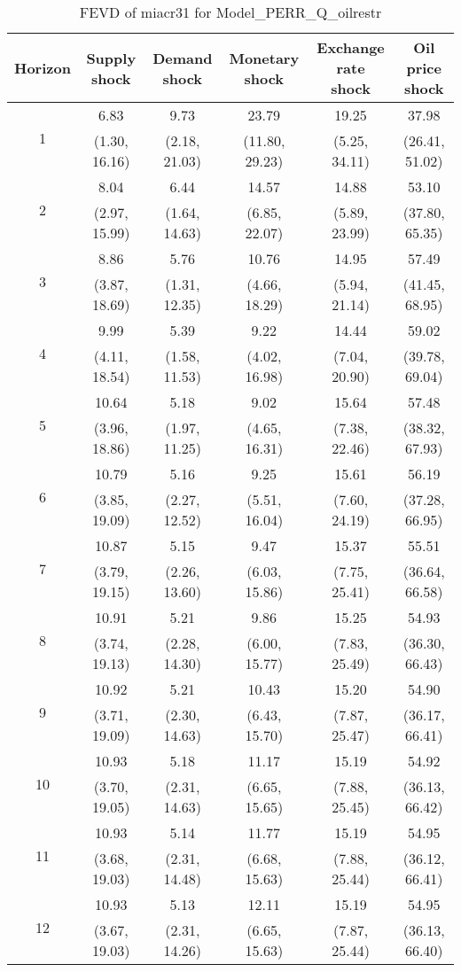 \documentclass{article}
\begin{document}
\begin{table}
	\footnotesize
	\caption{FEVD of miacr31 for Model_PERR_Q_oilrestr}
	\begin{tabular}{cccccc}
		Horizon & Supply shock & Demand shock & Monetary shock & Exchange rate shock & Oil price shock\\ \hline
		\multirow{2}{*}{1} & 6.83 & 9.73 & 23.79 & 19.25 & 37.98\\
		 & (1.30, 16.16) & (2.18, 21.03) & (11.80, 29.23) & (5.25, 34.11) & (26.41, 51.02)\\
		\multirow{2}{*}{2} & 8.04 & 6.44 & 14.57 & 14.88 & 53.10\\
		 & (2.97, 15.99) & (1.64, 14.63) & (6.85, 22.07) & (5.89, 23.99) & (37.80, 65.35)\\
		\multirow{2}{*}{3} & 8.86 & 5.76 & 10.76 & 14.95 & 57.49\\
		 & (3.87, 18.69) & (1.31, 12.35) & (4.66, 18.29) & (5.94, 21.14) & (41.45, 68.95)\\
		\multirow{2}{*}{4} & 9.99 & 5.39 & 9.22 & 14.44 & 59.02\\
		 & (4.11, 18.54) & (1.58, 11.53) & (4.02, 16.98) & (7.04, 20.90) & (39.78, 69.04)\\
		\multirow{2}{*}{5} & 10.64 & 5.18 & 9.02 & 15.64 & 57.48\\
		 & (3.96, 18.86) & (1.97, 11.25) & (4.65, 16.31) & (7.38, 22.46) & (38.32, 67.93)\\
		\multirow{2}{*}{6} & 10.79 & 5.16 & 9.25 & 15.61 & 56.19\\
		 & (3.85, 19.09) & (2.27, 12.52) & (5.51, 16.04) & (7.60, 24.19) & (37.28, 66.95)\\
		\multirow{2}{*}{7} & 10.87 & 5.15 & 9.47 & 15.37 & 55.51\\
		 & (3.79, 19.15) & (2.26, 13.60) & (6.03, 15.86) & (7.75, 25.41) & (36.64, 66.58)\\
		\multirow{2}{*}{8} & 10.91 & 5.21 & 9.86 & 15.25 & 54.93\\
		 & (3.74, 19.13) & (2.28, 14.30) & (6.00, 15.77) & (7.83, 25.49) & (36.30, 66.43)\\
		\multirow{2}{*}{9} & 10.92 & 5.21 & 10.43 & 15.20 & 54.90\\
		 & (3.71, 19.09) & (2.30, 14.63) & (6.43, 15.70) & (7.87, 25.47) & (36.17, 66.41)\\
		\multirow{2}{*}{10} & 10.93 & 5.18 & 11.17 & 15.19 & 54.92\\
		 & (3.70, 19.05) & (2.31, 14.63) & (6.65, 15.65) & (7.88, 25.45) & (36.13, 66.42)\\
		\multirow{2}{*}{11} & 10.93 & 5.14 & 11.77 & 15.19 & 54.95\\
		 & (3.68, 19.03) & (2.31, 14.48) & (6.68, 15.63) & (7.88, 25.44) & (36.12, 66.41)\\
		\multirow{2}{*}{12} & 10.93 & 5.13 & 12.11 & 15.19 & 54.95\\
		 & (3.67, 19.03) & (2.31, 14.26) & (6.65, 15.63) & (7.87, 25.44) & (36.13, 66.40)\\
	\end{tabular}
\label{tab:fevd-Model_PERR_Q_oilrestr-miacr31}
\end{table}
\end{document}
